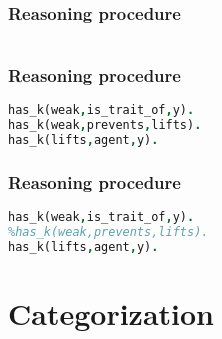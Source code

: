 \documentclass[c,8pt,xcolor...,x11names]{beamer}
\begin{document}
\begin{frame}[fragile]
\frametitle{Reasoning procedure}
\begin{columns}
	\begin{column}{0.70\textwidth}
	
	\end{column}	
\end{columns}
\end{frame}

\begin{frame}[fragile]
\frametitle{Reasoning procedure}

\centering


\begin{lstlisting}[language = Prolog, style=SC, numbers=right,
numberstyle=\tiny]
has_k(weak,is_trait_of,y). 		
has_k(weak,prevents,lifts).	 	
has_k(lifts,agent,y).		
\end{lstlisting}
\end{frame}

\begin{frame}[fragile]
\frametitle{Reasoning procedure}

\centering


\begin{lstlisting}[language = Prolog, style=SC, numbers=right,
numberstyle=\tiny]
has_k(weak,is_trait_of,y). 		
%has_k(weak,prevents,lifts).	 	
has_k(lifts,agent,y).		
\end{lstlisting}
\end{frame}

\section{Categorization} 
\end{document}
